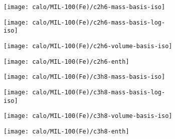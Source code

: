 \begin{figure}[H]

    \begin{subfigure}{0.25\textwidth}
        \texttt{[image: calo/MIL-100(Fe)/c2h6-mass-basis-iso]}%
        \label{appx:fgr:shaping:mil100c2h6mass}
    \end{subfigure}%
    \begin{subfigure}{0.25\textwidth}
        \texttt{[image: calo/MIL-100(Fe)/c2h6-mass-basis-log-iso]}%
        \label{appx:fgr:shaping:mil100c2h6masslog}
    \end{subfigure}%
    \begin{subfigure}{0.25\textwidth}
        \texttt{[image: calo/MIL-100(Fe)/c2h6-volume-basis-iso]}%
        \label{appx:fgr:shaping:mil100c2h6volume}
    \end{subfigure}%
    \begin{subfigure}{0.25\textwidth}
        \texttt{[image: calo/MIL-100(Fe)/c2h6-enth]}%
        \label{appx:fgr:shaping:mil100c2h6enth}
    \end{subfigure}%

    \begin{subfigure}{0.25\textwidth}
        \texttt{[image: calo/MIL-100(Fe)/c3h8-mass-basis-iso]}%
        \label{appx:fgr:shaping:mil100c3h8mass}
    \end{subfigure}%
    \begin{subfigure}{0.25\textwidth}
        \texttt{[image: calo/MIL-100(Fe)/c3h8-mass-basis-log-iso]}%
        \label{appx:fgr:shaping:mil100c3h8masslog}
    \end{subfigure}%
    \begin{subfigure}{0.25\textwidth}
        \texttt{[image: calo/MIL-100(Fe)/c3h8-volume-basis-iso]}%
        \label{appx:fgr:shaping:mil100c3h8volume}
    \end{subfigure}%
    \begin{subfigure}{0.25\textwidth}
        \texttt{[image: calo/MIL-100(Fe)/c3h8-enth]}%
        \label{appx:fgr:shaping:mil100c3h8enth}
    \end{subfigure}%


\end{figure}
